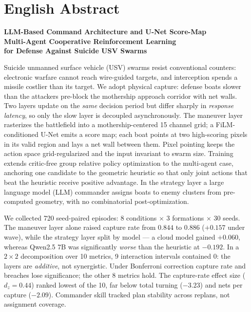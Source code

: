 
\section*{English Abstract}

\noindent\textbf{\large LLM-Based Command Architecture and U-Net Score-Map\\
Multi-Agent Cooperative Reinforcement Learning\\
for Defense Against Suicide USV Swarms}

\vspace{4pt}
\noindent
Suicide unmanned surface vehicle (USV) swarms resist conventional counters: electronic warfare
cannot reach wire-guided targets, and interception spends a missile costlier than its target.
We adopt physical capture: defense boats slower than the attackers
pre-block the mothership approach corridor with net walls. Two layers update on the
\emph{same} decision period but differ sharply in \emph{response latency}, so only the slow
layer is decoupled asynchronously. The maneuver layer
rasterizes the battlefield into a mothership-centered 15 channel grid; a FiLM-conditioned U-Net
emits a score map; each boat points at two high-scoring pixels in its valid region and
lays a net wall between them. Pixel pointing keeps the action space
grid-regularized and the input invariant to swarm size.
Training extends critic-free group relative policy optimization to the multi-agent case,
anchoring one candidate to the geometric heuristic so that only joint actions that beat
the heuristic receive positive advantage. In the strategy layer a large language model (LLM) commander
assigns boats to enemy clusters from pre-computed geometry, with no combinatorial
post-optimization.

\vspace{4pt}
\noindent
We collected 720 seed-paired episodes: 8 conditions $\times$ 3 formations $\times$ 30 seeds.
The maneuver layer alone raised capture rate from $0.844$ to $0.886$ ($+0.157$ under wave),
while the strategy layer split by model --- a cloud model gained $+0.060$, whereas Qwen2.5 7B
was significantly \emph{worse} than the heuristic at $-0.192$. In a $2\times2$ decomposition
over 10 metrics, 9 interaction intervals contained $0$: the layers are \emph{additive}, not
synergistic. Under Bonferroni correction capture rate and breaches lose significance; the
other 8 metrics hold. The capture-rate effect size ($d_z = 0.44$) ranked lowest of the 10, far below
total turning ($-3.23$) and nets per capture ($-2.09$). Commander skill tracked plan stability
across replans, not assignment coverage.


